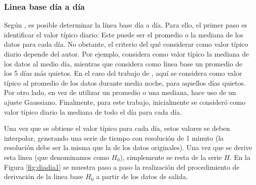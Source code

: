 \subsubsection{Linea base día a día}
Según \cite{baseline_Gjerloev}, es posible determinar la línea base día a día. Para ello, el primer paso es identificar el valor típico diario: Este puede ser el promedio o la mediana de los datos para cada día. No obstante, el criterio del qué considerar como valor típico diario depende del autor. Por ejemplo, \cite{vanKampt} considera como valor típico la mediana de los datos al medio día, mientras que \cite{ionos1} considera como linea base un promedio de los 5 días más quietos. En el caso del trabajo de \cite{2021amory}, aquí se considera como valor típico al promedio de los datos durante media noche, para aquellos días quietos. Por otro lado, \cite{baseline_Gjerloev} en vez de utilizar un promedio o una mediana, hace uso de un ajuste Gaussiano. Finalmente, para este trabajo, inicialmente se consideró como valor típico diario la mediana de todo el día para cada día. 
\vspace{1 em}

Una vez que se obtiene el valor típico para cada día, estos valores se deben interpolar, generando una serie de tiempo con resolución de 1 minuto (la resolución debe ser la misma que la de los datos originales). Una vez que se derive esta linea (que denominamos como $H_0$), simplemente se resta de la serie $H$. En la Figura \ref{fig:diadia1} se muestra paso a paso la realización del procedimiento de derivación de la linea base $H_0$ a partir de los datos de salida.
\vspace{1 em}

